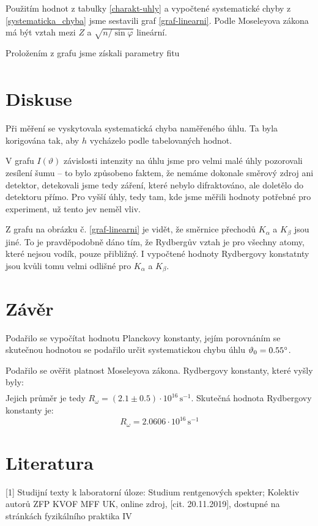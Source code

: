 \documentclass[10pt,a4paper]{article}
\renewcommand{\U}[1]{\ensuremath{\,\mathrm{#1}}}
\newcommand{\°}{\degree}
\begin{document}
Použitím hodnot z tabulky \ref{charakt-uhly} a vypočtené systematické chyby z \eqref{systematicka_chyba} jsme sestavili graf \ref{graf-linearni}. Podle Moseleyova zákona má být vztah mezi $Z$ a $\sqrt{n/\sin\varphi}$ lineární.

Proložením z grafu jsme získali parametry fitu
\begin{align*}
\end{align*}

\pagebreak

\section{Diskuse}
Při měření se vyskytovala systematická chyba naměřeného úhlu. Ta byla korigována tak, aby $h$ vycházelo podle tabelovaných hodnot.

V grafu $I(\vartheta)$ závislosti intenzity na úhlu jsme pro velmi malé úhly pozorovali zesílení šumu – to bylo způsobeno faktem, že nemáme dokonale směrový zdroj ani detektor, detekovali jsme tedy záření, které nebylo difraktováno, ale doletělo do detektoru přímo. Pro vyšší úhly, tedy tam, kde jsme měřili hodnoty potřebné pro experiment, už tento jev neměl vliv.

Z grafu na obrázku č. \ref{graf-linearni} je vidět, že směrnice přechodů $K_\alpha$ a $K_\beta$ jsou jiné. To je pravděpodobně dáno tím, že Rydbergův vztah je pro všechny atomy, které nejsou vodík, pouze přibližný. I vypočtené hodnoty Rydbergovy konstatnty jsou kvůli tomu velmi odlišné pro $K_\alpha$ a $K_\beta$.


\section{Závěr}
Podařilo se vypočítat hodnotu Planckovy konstanty, jejím porovnáním se skutečnou hodnotou se podařilo určit systematickou chybu úhlu $\vartheta_0 = 0.55 \°$.

Podařilo se ověřit platnost Moseleyova zákona. Rydbergovy konstanty, které vyšly byly:
\begin{align*}
\end{align*}
Jejich průměr je tedy $R_\omega = (2.1 \pm 0.5) \cdot 10^{16} \U{s^{-1}}$. Skutečná hodnota Rydbergovy konstanty je:
\begin{equation*}
    R_\omega = 2.0606 \cdot 10^{16} \U{s^{-1}}
\end{equation*}




\section{Literatura}
[1] Studijní texty k laboratorní úloze: Studium rentgenových spekter; Kolektiv autorů ZFP KVOF MFF UK, online zdroj, [cit. 20.11.2019], dostupné na stránkách fyzikálního praktika IV
\end{document}
